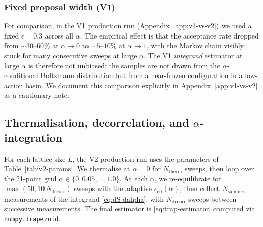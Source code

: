 \documentclass[11pt,a4paper]{article}
\theoremstyle{definition}
\begin{document}
\subsubsection{Fixed proposal width (V1)}

For comparison, in the V1 production run (Appendix~\ref{app:v1-vs-v2})
we used a fixed $\epsilon = 0.3$ across all $\alpha$. The
empirical effect is that the acceptance rate dropped from
$\sim 30$--$60\%$ at $\alpha \to 0$ to $\sim 5$--$10\%$ at $\alpha \to
1$, with the Markov chain visibly stuck for many consecutive sweeps
at large $\alpha$. The V1 \emph{integrand} estimator at large $\alpha$
is therefore not unbiased: the samples are not drawn from the
$\alpha$-conditional Boltzmann distribution but from a near-frozen
configuration in a low-action basin. We document this comparison
explicitly in Appendix~\ref{app:v1-vs-v2} as a cautionary note.

\subsection{Thermalisation, decorrelation, and $\alpha$-integration}

For each lattice size $L$, the V2 production run uses the
parameters of Table~\ref{tab:v2-params}. We thermalise at $\alpha =
0$ for $N_{\mathrm{therm}}$ sweeps, then loop over the 21-point grid
$\alpha \in \{0, 0.05, \ldots, 1.0\}$. At each $\alpha$, we
re-equilibrate for $\max(50, 10\,N_{\mathrm{decorr}})$ sweeps with
the adaptive $\epsilon_{\mathrm{eff}}(\alpha)$, then collect
$N_{\mathrm{samples}}$ measurements of the integrand
\eqref{eq:dS-dalpha}, with $N_{\mathrm{decorr}}$ sweeps between
successive measurements. The final estimator is
\eqref{eq:trap-estimator} computed via
\verb|numpy.trapezoid|.
\end{document}
